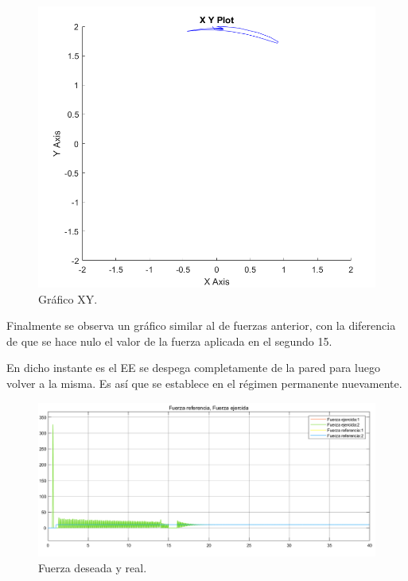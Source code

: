 \begin{figure}[H]
	\centering
	\includegraphics[width=0.5\linewidth]{ImagenesControl de fuerza no lineal/2_3_f_c}
	\caption{Gráfico XY.}	
	\label{fig:bxyd_f}
\end{figure}

Finalmente se observa un gráfico similar al de fuerzas anterior, con la diferencia de que se hace nulo el valor de la fuerza aplicada en el segundo 15. 

En dicho instante es el EE se despega completamente de la pared para luego volver a la misma. Es así que se establece en el régimen permanente nuevamente.

\begin{figure}[H]
	\centering
	\includegraphics[width=0.8\linewidth]{ImagenesControl de fuerza no lineal/2_3_f_e}
	\caption{Fuerza deseada y real.}	
	\label{fig:bfd_f}
\end{figure}
%
